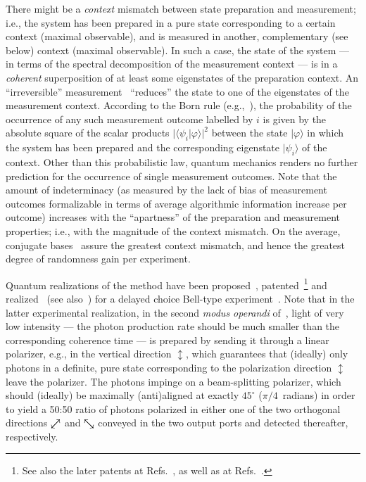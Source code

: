 \documentclass[10pt]{article}%
\begin{document}
There might be a {\em context} mismatch between state preparation and measurement;
i.e.,  the system has been prepared in a pure state
corresponding to a certain context (maximal observable),
and is measured in another,  complementary (see below) context
(maximal observable).
In such a case, the state of the system --- in terms of the spectral decomposition
of the measurement context --- is in a {\em coherent} superposition of at least some eigenstates of the preparation context.
An ``irreversible'' measurement~\cite{hkwz,greenberger2} ``reduces'' the state to one of the eigenstates
of the measurement context.
According to the Born rule (e.g.,~\cite[Chapter~1]{mermin-07}),
the probability of the occurrence of any such measurement outcome labelled by $i$
is given by the absolute square of the scalar products
$\vert \langle \psi_i \vert \varphi \rangle \vert^2$
between the state $\vert \varphi \rangle$  in which the system has been prepared
and the corresponding eigenstate $\vert \psi_i \rangle$
of the context.
Other than this probabilistic law, quantum mechanics renders no further prediction for the occurrence of single measurement
outcomes.
Note that the amount of indeterminacy (as measured by the lack of bias of measurement outcomes
formalizable in terms of average algorithmic information increase per outcome)
increases with the ``apartness'' of the preparation and measurement properties;
i.e., with the magnitude of the context mismatch.
On the average, conjugate bases~\cite[p.~86]{wiesner} assure the greatest context mismatch,
and hence the greatest degree of randomness gain per experiment.


Quantum realizations of the method have been proposed~\cite{svozil-qct,rarity-94}, patented~\footnote{
See also the later patents at Refs.~\cite{dultz-98,dultz-99},
as well as at Refs.~\cite{Ribordy-04,Ribordy-06}.}
and realized~\cite[Fig.~1(b)]{zeilinger:qct} (see also~\cite{stefanov-2000})
for a delayed choice Bell-type experiment~\cite{zeilinger-epr-98}.
Note that in the latter experimental realization, in the second {\em modus operandi} of~\cite{zeilinger-epr-98},
light of very low intensity --- the photon production rate should be much smaller than the corresponding coherence time ---
is prepared by sending it through a linear polarizer, e.g., in the vertical direction $\updownarrow$,
which guarantees that (ideally) only photons in a definite,
pure state corresponding to the polarization direction $\updownarrow$ leave the polarizer.
The photons impinge on a beam-splitting polarizer,
which should (ideally) be maximally (anti)aligned at exactly $45^\circ$ ($\pi/4$~radians) in order to yield a 50:50 ratio of photons
polarized in either one of the two orthogonal directions $\swarrow\mkern-18mu\nearrow$
and $\searrow\mkern-18mu\nwarrow$ conveyed
in the two output ports and detected thereafter, respectively.
\end{document}
